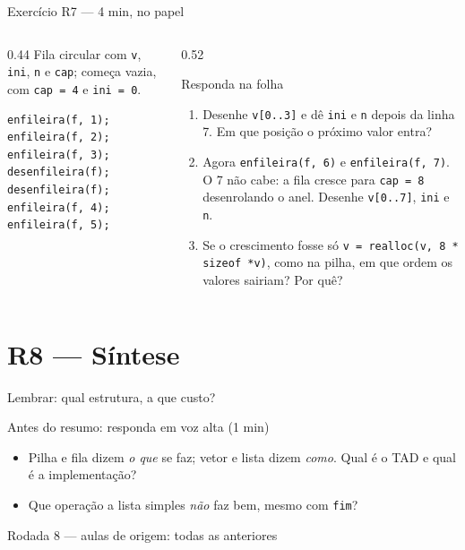 \documentclass[aspectratio=169]{beamer}
\newcommand{\rodada}[4]{%
  \begin{frame}{Lembrar: #2}
    \begin{block}{Antes do resumo: responda em voz alta (1 min)}
      #4
    \end{block}
    \vfill
    {\small\textcolor{UFSGray}{Rodada #1 --- aulas de origem:} #3}
  \end{frame}}
\begin{document}
\begin{frame}[fragile]{Exercício R7 --- 4 min, no papel}
  \begin{columns}[T]
    \begin{column}{0.44\textwidth}
      \scriptsize Fila circular com \texttt{v}, \texttt{ini}, \texttt{n} e
      \texttt{cap}; começa vazia, com \texttt{cap = 4} e \texttt{ini = 0}.
\begin{lstlisting}[style=numC]
enfileira(f, 1);
enfileira(f, 2);
enfileira(f, 3);
desenfileira(f);
desenfileira(f);
enfileira(f, 4);
enfileira(f, 5);
\end{lstlisting}
    \end{column}
    \begin{column}{0.52\textwidth}
      \begin{block}{Responda na folha}
        \scriptsize
        \begin{enumerate}
          \item[(a)] Desenhe \texttt{v[0..3]} e dê \texttt{ini} e \texttt{n}
            depois da linha 7. Em que posição o próximo valor entra?
          \item[(b)] Agora \texttt{enfileira(f, 6)} e \texttt{enfileira(f, 7)}.
            O 7 não cabe: a fila cresce para \texttt{cap = 8}
            desenrolando o anel. Desenhe \texttt{v[0..7]}, \texttt{ini} e
            \texttt{n}.
          \item[(c)] Se o crescimento fosse só
            \texttt{v = realloc(v, 8 * sizeof *v)}, como na pilha, em que
            ordem os valores sairiam? Por quê?
        \end{enumerate}
      \end{block}
    \end{column}
  \end{columns}
\end{frame}

\section{R8 --- Síntese}

\rodada{8}{qual estrutura, a que custo?}{todas as anteriores}{
  \begin{itemize}
    \item Pilha e fila dizem \emph{o que} se faz; vetor e lista dizem
      \emph{como}. Qual é o TAD e qual é a implementação?
    \item Que operação a lista simples \emph{não} faz bem, mesmo com
      \texttt{fim}?
  \end{itemize}}
\end{document}
